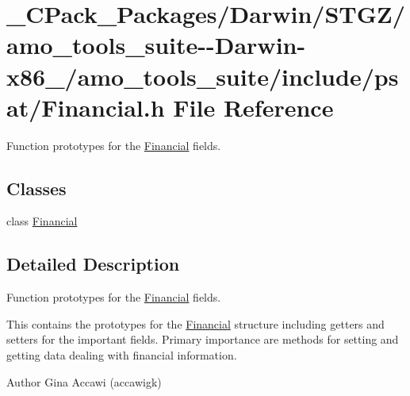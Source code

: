 \hypertarget{___c_pack___packages_2_darwin_2_s_t_g_z_2amo__tools__suite--_darwin-x86__64_2amo__tools__suite_2include_2psat_2_financial_8h}{}\section{\+\_\+\+C\+Pack\+\_\+\+Packages/\+Darwin/\+S\+T\+G\+Z/amo\+\_\+tools\+\_\+suite-\/-\/\+Darwin-\/x86\+\_/amo\+\_\+tools\+\_\+suite/include/psat/\+Financial.h File Reference}
\label{___c_pack___packages_2_darwin_2_s_t_g_z_2amo__tools__suite--_darwin-x86__64_2amo__tools__suite_2include_2psat_2_financial_8h}


Function prototypes for the \hyperlink{class_financial}{Financial} fields.  


\subsection*{Classes}
\begin{DoxyCompactItemize}
\item 
class \hyperlink{class_financial}{Financial}
\end{DoxyCompactItemize}


\subsection{Detailed Description}
Function prototypes for the \hyperlink{class_financial}{Financial} fields. 

This contains the prototypes for the \hyperlink{class_financial}{Financial} structure including getters and setters for the important fields. Primary importance are methods for setting and getting data dealing with financial information.

\begin{DoxyAuthor}{Author}
Gina Accawi (accawigk) 
\end{DoxyAuthor}
